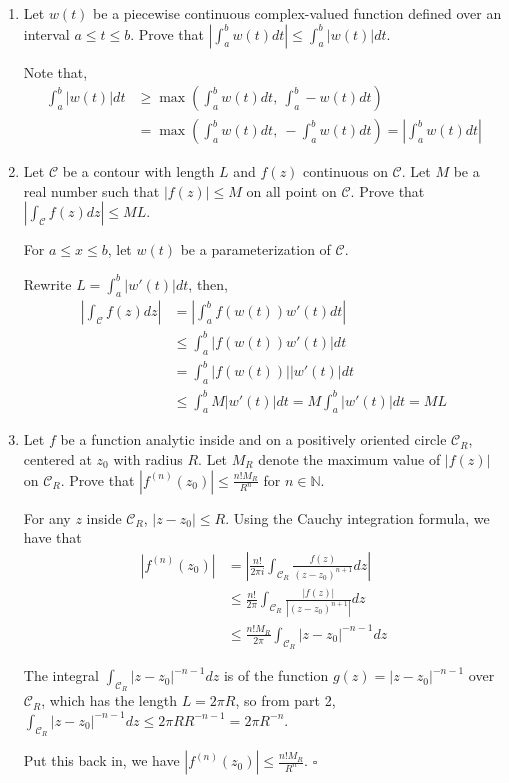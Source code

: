 \documentclass[12pt]{article}
\begin{document}
\begin{enumerate}
    \item Let $w(t)$ be a piecewise continuous complex-valued function defined over an interval $a\leq t\leq b$.  Prove that $\left|\int_a^b w(t)dt\right|\leq\int_a^b|w(t)|dt$.
    
    Note that,
    \begin{align*}
    \int^b_a |w(t)| dt &\geq \max{(\int^b_a w(t)dt, ~\int^b_a -w(t) dt)}\\ 
    &=  \max{(\int^b_a w(t)dt, ~-\int^b_a w(t) dt)} = \left|\int^b_a w(t)dt\right|
    \end{align*}

    \item Let $\mathcal{C}$ be a contour with length $L$ and $f(z)$ continuous on $\mathcal{C}$.  Let $M$ be a real number such that $|f(z)|\leq M$ on all point on $\mathcal{C}$.  Prove that $\left|\int_\mathcal{C}f(z)dz\right|\leq ML$.
    
    For $a\le x \le b$, let $w(t)$ be a parameterization of $\mathcal{C}$.

    Rewrite $L = \int^b_a |w'(t)| dt$, then,
    \begin{align*}
    \left|\int_\mathcal{C}f(z)dz\right| &= \left|\int_a^b f(w(t)) w'(t) dt\right| \\
    &\le \int^b_a |f(w(t))w'(t)|dt \\
    &= \int^b_a |f(w(t))| |w'(t)| dt \\
    &\le \int^b_a M |w'(t)|dt = M\int^b_a |w'(t)|dt = ML
    \end{align*}

    \item Let $f$ be a function analytic inside and on a positively oriented circle $\mathcal{C}_R$, centered at $z_0$ with radius $R$.  Let $M_R$ denote the maximum value of $|f(z)|$ on $\mathcal{C}_R$.  Prove that $|f^{(n)}(z_0)|\leq \frac{n!M_R}{R^n}$ for $n\in\mathbb{N}$.    
    
    For any $z$ inside $\mathcal{C}_R$, $|z-z_0| \le R$.
    Using the Cauchy integration formula, we have that
    \begin{align*}
    |f^{(n)} (z_0)| &= \left| \frac{n!}{2\pi i} \int_{\mathcal{C}_R} \frac{f(z)}{(z-z_0)^{n+1}} dz\right|\\
        &\le \frac{n!}{2\pi } \int_{\mathcal{C}_R} \frac{\left| f(z)\right|}{\left|(z-z_0)^{n+1}\right|}dz\\
        &\le \frac{n! M_R}{2\pi } \int_{\mathcal{C}_R}|z-z_0|^{-n-1}dz
    \end{align*}

    The integral $\int_{\mathcal{C}_R}|z-z_0|^{-n-1}dz$ is of the function $g(z) = |z-z_0|^{-n-1}$ over $\mathcal{C}_R$, which has the length $L =2\pi R$, so from part 2, $\int_{\mathcal{C}_R}|z-z_0|^{-n-1}dz \le 2\pi RR^{-n-1} = 2\pi R^{-n}$.
   
    Put this back in, we have $|f^{(n)} (z_0)| \le \frac{n! M_R}{R^n}$. $\square$
\end{enumerate}
\end{document}
